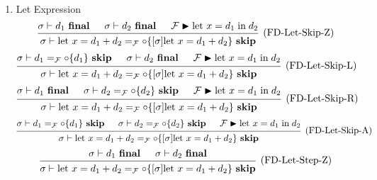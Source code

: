 \documentclass{article}
\newcommand{\entails}{\mathrel{\mathop{\vdash}}}
\newcommand{\skips}{\mathrel{\mathop{\blacktriangleright}}}
\newcommand{\final}{~\mathbf{final}}
\newcommand{\iskip}{~\mathbf{skip}}
\newcommand{\fin}{\mathrel{\mathop{\text{in}}}}
\newcommand{\flet}{\mathrm{let}~}
\begin{document}
\begin{enumerate}
\begin{enumerate}
      \item Let Expression
        \[
          \begin{prooftree}
            \hypo{\sigma \entails d_1 \final}
            \hypo{\sigma \entails d_2 \final}
            \hypo{\mathcal{F} \skips \flet x = d_1 \fin d_2}
            \infer3[(FD-Let-Skip-Z)]{
              \sigma \entails
              \flet x = d_1 + d_2
              =_\mathcal{F}
              \circ \{ [\sigma] \flet x = d_1 + d_2 \} \iskip
            }
          \end{prooftree}
        \]
        \[
          \begin{prooftree}
            \hypo{\sigma \entails d_1 =_\mathcal{F} \circ \{ d_1 \} \iskip}
            \hypo{\sigma \entails d_2 \final}
            \hypo{\mathcal{F} \skips \flet x = d_1 \fin d_2}
            \infer3[(FD-Let-Skip-L)]{
              \sigma \entails
              \flet x = d_1 + d_2
              =_\mathcal{F}
              \circ \{ [\sigma] \flet x = d_1 + d_2 \} \iskip
            }
          \end{prooftree}
        \]
        \[
          \begin{prooftree}
            \hypo{\sigma \entails d_1 \final}
            \hypo{\sigma \entails d_2 =_\mathcal{F} \circ \{ d_2 \} \iskip}
            \hypo{\mathcal{F} \skips \flet x = d_1 \fin d_2}
            \infer3[(FD-Let-Skip-R)]{
              \sigma \entails
              \flet x = d_1 + d_2
              =_\mathcal{F}
              \circ \{ [\sigma] \flet x = d_1 + d_2 \} \iskip
            }
          \end{prooftree}
        \]
        \[
          \begin{prooftree}
            \hypo{\sigma \entails d_1 =_\mathcal{F} \circ \{ d_1 \} \iskip}
            \hypo{\sigma \entails d_2 =_\mathcal{F} \circ \{ d_2 \} \iskip}
            \hypo{\mathcal{F} \skips \flet x = d_1 \fin d_2}
            \infer3[(FD-Let-Skip-A)]{
              \sigma \entails
              \flet x = d_1 + d_2
              =_\mathcal{F}
              \circ \{ [\sigma] \flet x = d_1 + d_2 \} \iskip
            }
          \end{prooftree}
        \]
        \[
          \begin{prooftree}
            \hypo{\sigma \entails d_1 \final}
            \hypo{\sigma \entails d_2 \final}
            \infer2[(FD-Let-Step-Z)]{
              \sigma \entails
              \flet x = d_1 + d_2
              =_\mathcal{F}
              \circ \{ [\sigma] \flet x = d_1 + d_2 \} \iskip
}
\end{prooftree}\]
\end{enumerate}
\end{enumerate}
\end{document}
